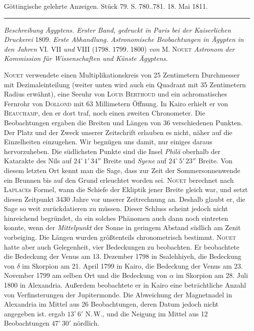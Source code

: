 \hypertarget{native-539Nouet}{}\label{native-539Nouet}
\begin{center}\small Göttingische gelehrte Anzeigen. Stück 79. S. 780..781. 18. Mai 1811.\\[3pt]\rule{.72\linewidth}{.3pt}\end{center}

\emph{Beschreibung Ägyptens. Erster Band, gedruckt in Paris bei der Kaiserlichen Druckerei} 1809. \raisebox{-0.3ex}{,}\emph{Erste Abhandlung. Astronomische Beobachtungen in Ägypten in den Jahren} VI. VII \emph{und} VIII (1798. 1799. 1800) \emph{von} M. \textsc{Nouet} \emph{Astronom der Kommission für Wissenschaften und Künste Ägyptens.}

\textsc{Nouet} verwendete einen Multiplikationskreis von 25 Zentimetern Durchmesser mit Dezimaleinteilung (weiter unten wird auch ein Quadrant mit 35 Zentimetern Radius erwähnt), eine Seeuhr von \textsc{Louis Berthoud} und ein achromatisches Fernrohr von \textsc{Dollond} mit 63 Millimetern Öffnung. In Kairo erhielt er von \textsc{Beauchamp}, den er dort traf, noch einen zweiten Chronometer. Die Beobachtungen ergaben die Breiten und Längen von 36 verschiedenen Punkten. Der Platz und der Zweck unserer Zeitschrift erlauben es nicht, näher auf die Einzelheiten einzugehen. Wir begnügen uns damit, nur einiges daraus hervorzuheben. Die südlichsten Punkte sind die Insel \emph{Philä} oberhalb der Katarakte des Nils auf $24^\circ\,1'\,34''$ Breite und \emph{Syene} auf $24^\circ\,5'\,23''$ Breite. Von diesem letzten Ort kennt man die Sage, dass zur Zeit der Sommersonnenwende ein Brunnen bis auf den Grund erleuchtet worden sei. \textsc{Nouet} berechnet nach \textsc{Laplace}s Formel, wann die Schiefe der Ekliptik jener Breite gleich war, und setzt diesen Zeitpunkt 3430 Jahre vor unserer Zeitrechnung an. Deshalb glaubt er, die Sage so weit zurückdatieren zu müssen. Dieser Schluss scheint jedoch nicht hinreichend begründet, da ein solches Phänomen auch dann noch eintreten konnte, wenn der \emph{Mittelpunkt} der Sonne in geringem Abstand südlich am Zenit vorbeiging. Die Längen wurden größtenteils chronometrisch bestimmt. \textsc{Nouet} hatte aber auch Gelegenheit, vier Bedeckungen zu beobachten. Er beobachtete die Bedeckung der Venus am 13. Dezember 1798 in Ssalehhiyeh, die Bedeckung von $\delta$ im Skorpion am 21. April 1799 in Kairo, die Bedeckung der Venus am 23. November 1799 am selben Ort und die Bedeckung von $\alpha$ im Skorpion am 28. Juli 1800 in Alexandria. Außerdem beobachtete er in Kairo eine beträchtliche Anzahl von Verfinsterungen der Jupitermonde. Die Abweichung der Magnetnadel in Alexandria im Mittel aus 26 Beobachtungen, deren Datum jedoch nicht angegeben ist. ergab $13^\circ\,6'$ N.\,W., und die Neigung im Mittel aus 12 Beobachtungen $47^\circ\,30'$ nördlich.
